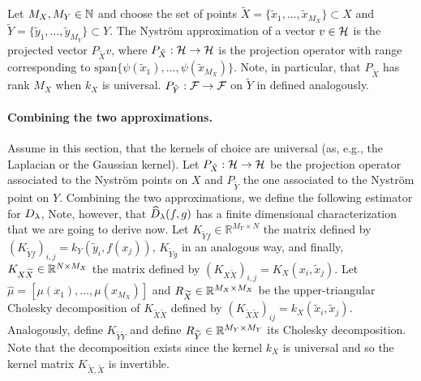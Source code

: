 Let $M_X, M_Y \in \mathbb N$ and choose the set of points $\widetilde{X} = \lbrace \widetilde x_1, \ldots, \widetilde x_{M_X}\rbrace \subset X$ and $\widetilde{Y} = \lbrace \widetilde y_1, \ldots, \widetilde y_{M_Y} \} \subset Y$. The Nystr\"om approximation of a vector $v \in \mathcal H$ is the projected vector $P_{\tilde{X}} v$, where $P_{\tilde{X}} :\mathcal H \to \mathcal H$ is the projection operator with range corresponding to $\textrm{span} \{\psi(\tilde{x}_1),\dots,\psi(\tilde{x}_{M_X})\}$. Note, in particular, that $P_{\tilde{X}}$ has rank $M_X$ when $k_X$ is universal. $P_{\tilde{Y}}: {\cal F} \to {\cal F}$ on $\tilde{Y}$ in defined analogously.


\paragraph{Combining the two approximations.}
Assume in this section, that the kernels of choice are universal (as, e.g., the Laplacian or the Gaussian kernel).
Let $P_{\tilde{X}}:\mathcal H \to \mathcal H$ be the projection operator associated to the Nystr\"om points on $X$ and $P_{\tilde{Y}}$ the one associated to the Nystr\"om point on $Y$. Combining the two approximations, we define the following estimator for $D_\lambda$,
Note, however, that $\widehat{D}_\lambda(f,g)$ has a finite dimensional characterization that we are going to derive now.
Let $K_{\widetilde Y f} \in \mathbb R^{M_Y \times N}$ the matrix defined by $(K_{\widetilde Y f})_{i, j} = k_Y(\widetilde y_i, f(x_j))$, $K_{\widetilde Y g}$ in an analogous way, and finally, $K_{X \widetilde X}\in\mathbb R^{N \times M_X}$ the matrix defined by $(K_{X\widetilde X})_{i, j} = K_X(x_i, \widetilde x_j)$. Let $\widehat \mu = \left[ \mu(x_1), \ldots, \mu(x_{M_X})\right]$ and $R_{\widetilde X} \in\mathbb R^{M_X \times M_X}$ be the upper-triangular Cholesky decomposition of $K_{\widetilde X \widetilde X}$ defined by $(K_{\widetilde X \widetilde X})_{ij} = k_X(\widetilde x_i, \widetilde x_j)$. Analogously, define $K_{\widetilde Y \widetilde Y}$ and define $R_{\widetilde Y}\in\mathbb R^{M_Y \times M_Y}$ its Cholesky decomposition. Note that the decomposition exists since the kernel $k_X$ is universal and so the kernel matrix $K_{\tilde{X},\tilde{X}}$ is invertible.


